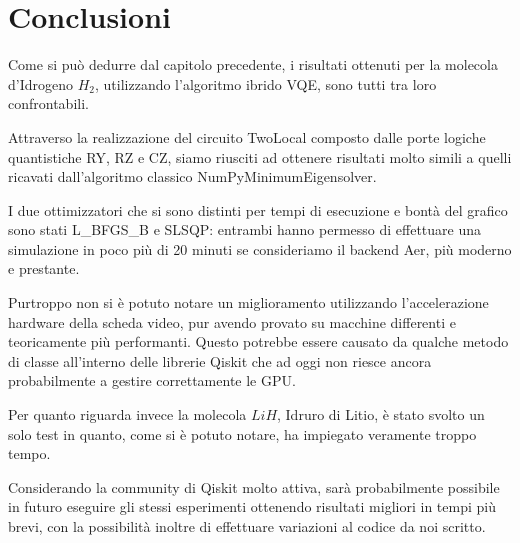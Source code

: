 \chapter*{Conclusioni}
Come si può dedurre dal capitolo precedente, i risultati ottenuti per la molecola d'Idrogeno $H_2$, utilizzando l'algoritmo ibrido VQE, sono tutti tra loro confrontabili.

Attraverso la realizzazione del circuito TwoLocal composto dalle porte logiche quantistiche RY, RZ e CZ, siamo riusciti ad ottenere risultati molto simili a quelli ricavati dall'algoritmo classico NumPyMinimumEigensolver.

I due ottimizzatori che si sono distinti per tempi di esecuzione e bontà del grafico sono stati L\_BFGS\_B e SLSQP: entrambi hanno permesso di effettuare una simulazione in poco più di 20 minuti se consideriamo il backend Aer, più moderno e prestante.

Purtroppo non si è potuto notare un miglioramento utilizzando l'accelerazione hardware della scheda video, pur avendo provato su macchine differenti e teoricamente più performanti.
Questo potrebbe essere causato da qualche metodo di classe all'interno delle librerie Qiskit che ad oggi non riesce ancora probabilmente a gestire correttamente le GPU.

Per quanto riguarda invece la molecola $LiH$, Idruro di Litio, è stato svolto un solo test in quanto, come si è potuto notare, ha impiegato veramente troppo tempo.

Considerando la community di Qiskit molto attiva, sarà probabilmente possibile in futuro eseguire gli stessi esperimenti ottenendo risultati migliori in tempi più brevi, con la possibilità inoltre di effettuare variazioni al codice da noi scritto.